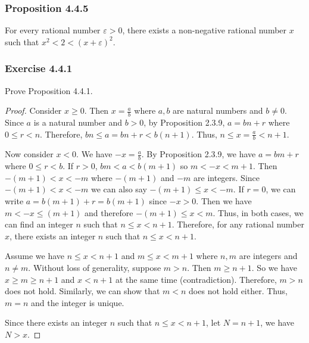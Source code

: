 \documentclass[12pt, letter]{article}
\begin{document}
\subsubsection*{Proposition 4.4.5}
For every rational number $\varepsilon>0$, there exists a non-negative rational number $x$ such that $x^2<2<(x+\varepsilon)^2$.
\subsubsection*{Exercise 4.4.1}
Prove Proposition 4.4.1.
\begin{proof}
    Consider $x\geq 0$. Then $x=\frac{a}{b}$ where $a,b$ are natural numbers and $b\ne 0$. Since $a$ is a natural number and $b>0$, by Proposition 2.3.9, $a=bn+r$ where $0\leq r<n$. 
    Therefore, $bn\leq a=bn+r< b(n+1)$. Thus, $n\leq x=\frac{a}{b}<n+1$. 

    Now consider $x<0$. We have $-x=\frac{a}{b}$. By Proposition 2.3.9, we have $a=bm+r$ where $0\leq r<b$. If $r>0$, $bm<a<b(m+1)$ so $m<-x<m+1$. Then $-(m+1)<x<-m$ where $-(m+1)$ and $-m$ are integers.
    Since $-(m+1)<x<-m$ we can also say $-(m+1)\leq x<-m$.
    If $r=0$, we can write $a=b(m+1)+r=b(m+1)$ since $-x>0$. Then we have $m<-x\leq (m+1)$ and therefore $-(m+1)\leq x<m$. 
    Thus, in both cases, we can find an integer $n$ such that $n\leq x<n+1$. Therefore, for any rational number $x$, there exists an integer 
    $n$ such that $n\leq x<n+1$.

    Assume we have $n\leq x<n+1$ and $m\leq x<m+1$ where $n,m$ are integers and $n\ne m$. Without loss of generality, suppose $m>n$. Then $m\geq n+1$. So we have 
    $x\geq m\geq n+1$ and $x<n+1$ at the same time (contradiction). Therefore, $m>n$ does not hold. Similarly, we can show that $m<n$ does not hold either. Thus, $m=n$ and the integer is unique.

    Since there exists an integer $n$ such that $n\leq x<n+1$, let $N=n+1$, we have $N>x$.
\end{proof}
\end{document}
